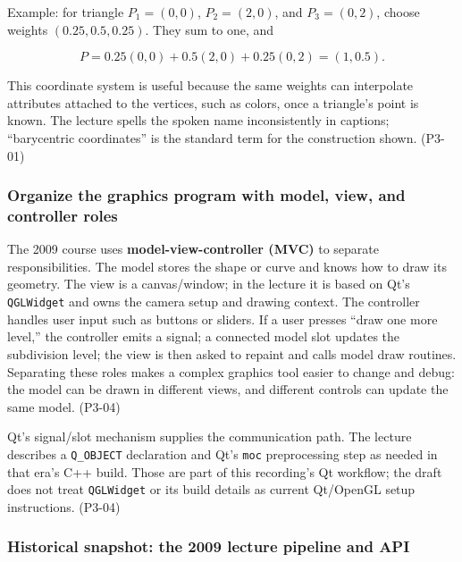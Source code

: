 Example: for triangle \(P_1=(0,0)\), \(P_2=(2,0)\), and \(P_3=(0,2)\), choose weights \((0.25,0.5,0.25)\). They sum to one, and

\[
P=0.25(0,0)+0.5(2,0)+0.25(0,2)=(1,0.5).
\]

This coordinate system is useful because the same weights can interpolate attributes attached to the vertices, such as colors, once a triangle's point is known. The lecture spells the spoken name inconsistently in captions; ``barycentric coordinates'' is the standard term for the construction shown. (P3-01)

\subsubsection{Organize the graphics program with model, view, and controller roles}\label{03-visual-computing-i-ch018-organize-the-graphics-program-with-model-view-and-controller-roles}

\hypertarget{03-visual-computing-i-ch018-organize-the-graphics-program-with-model-view-and-controller-roles}{}

The 2009 course uses \textbf{model-view-controller (MVC)} to separate responsibilities. The model stores the shape or curve and knows how to draw its geometry. The view is a canvas/window; in the lecture it is based on Qt's \texttt{QGLWidget} and owns the camera setup and drawing context. The controller handles user input such as buttons or sliders. If a user presses ``draw one more level,'' the controller emits a signal; a connected model slot updates the subdivision level; the view is then asked to repaint and calls model draw routines. Separating these roles makes a complex graphics tool easier to change and debug: the model can be drawn in different views, and different controls can update the same model. (P3-04)

Qt's signal/slot mechanism supplies the communication path. The lecture describes a \texttt{Q\_OBJECT} declaration and Qt's \texttt{moc} preprocessing step as needed in that era's C++ build. Those are part of this recording's Qt workflow; the draft does not treat \texttt{QGLWidget} or its build details as current Qt/OpenGL setup instructions. (P3-04)

\subsubsection{Historical snapshot: the 2009 lecture pipeline and API}\label{03-visual-computing-i-ch018-historical-snapshot-the-2009-lecture-pipeline-and-api}

